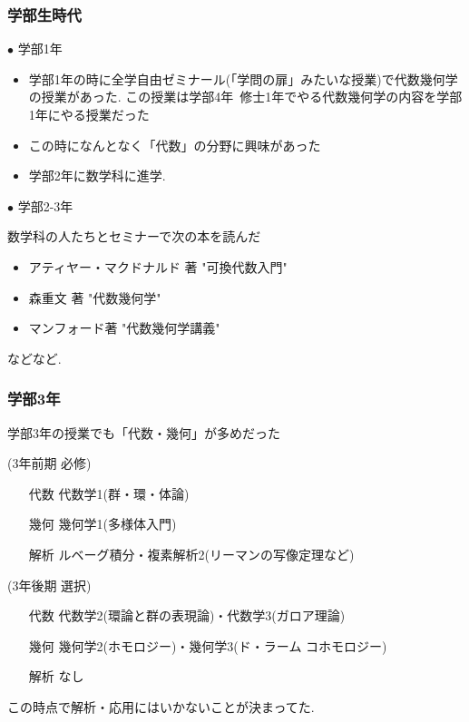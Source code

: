 \documentclass[11pt,dvipdfmx]{beamer}
\theoremstyle{definition}
\theoremstyle{remark}
\begin{document}
\begin{frame} 
 \frametitle{学部生時代}

 \vspace{11pt}
  $\bullet$ 学部1年
  \begin{itemize}
 \item 学部1年の時に全学自由ゼミナール(「学問の扉」みたいな授業)で代数幾何学の授業があった. この授業は学部4年~修士1年でやる代数幾何学の内容を学部1年にやる授業だった
 \item この時になんとなく「代数」の分野に興味があった
\item 学部2年に数学科に進学. 
\end{itemize}

\pause
 \vspace{11pt}
  $\bullet$ 学部2-3年
  
 数学科の人たちとセミナーで次の本を読んだ
 \begin{itemize}
 \item アティヤー・マクドナルド 著 "可換代数入門"
 \item 森重文 著  "代数幾何学"
 \item マンフォード著 "代数幾何学講義"
 \end{itemize}
などなど.

\end{frame}



\begin{frame} 
 \frametitle{学部3年}
 


学部3年の授業でも「代数・幾何」が多めだった

\vspace{5pt}
(3年前期 必修)
 \begin{itemize}
 \item[代数] 代数学1(群・環・体論)
 \item[幾何] 幾何学1(多様体入門)
 \item[解析] ルベーグ積分・複素解析2(リーマンの写像定理など)
 \end{itemize}


\vspace{5pt}
(3年後期 選択)
 \begin{itemize}
 \item[代数] 代数学2(環論と群の表現論)・代数学3(ガロア理論)
 \item[幾何] 幾何学2(ホモロジー)・幾何学3(ド・ラーム コホモロジー)
 \item[解析] なし
 \end{itemize}

この時点で解析・応用にはいかないことが決まってた. 
\end{frame}
\end{document}
